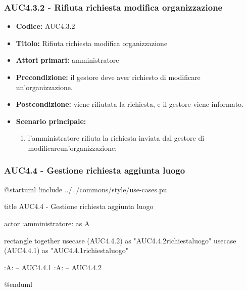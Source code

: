 \documentclass[casi-duso]{subfiles}
\begin{document}
\subsubsection{AUC4.3.2 - Rifiuta richiesta modifica organizzazione}%
\label{subsub:AUC4.3.2}
\begin{itemize}
  \item \textbf{Codice:} AUC4.3.2
  \item \textbf{Titolo:} Rifiuta richiesta modifica organizzazione
  \item \textbf{Attori primari:} amministratore
  \item \textbf{Precondizione:} il gestore deve aver richiesto di modificare un'organizzazione.
  \item \textbf{Postcondizione:} viene rifiutata la richiesta, e il gestore viene informato.
  \item \textbf{Scenario principale:}
  \begin{enumerate}
    \item l'amministratore rifiuta la richiesta inviata dal gestore di modificareun'organizzazione;
  \end{enumerate}
\end{itemize}

\subsubsection{AUC4.4 - Gestione richiesta aggiunta luogo}%
\label{subsub:AUC4.4}

\begin{plantuml}
@startuml
!include ../../commons/style/use-cases.pu

title AUC4.4 - Gestione richiesta aggiunta luogo

actor :amministratore: as A

rectangle {
  together {
    usecase (AUC4.4.2) as "AUC4.4.2\nRifiuta richiesta\naggiungi luogo"
    usecase (AUC4.4.1) as "AUC4.4.1\nAccetta richiesta\naggiungi luogo"
  }
}

:A: -- AUC4.4.1
:A: -- AUC4.4.2

@enduml
\end{plantuml}
\end{document}
